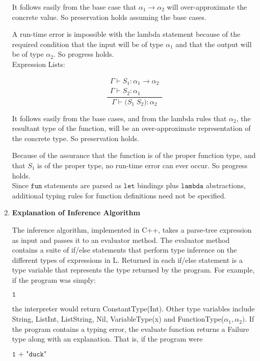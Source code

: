 \documentclass[10pt]{article} %
\begin{document}
\begin{enumerate}
It follows easily from the base case that $\alpha_1 \to \alpha_2$ will over-approximate the concrete value.  So preservation holds assuming the base cases.

A run-time error is impossible with the lambda statement because of the required condition that the input will be of type $\alpha_1$ and that the output will be of type $\alpha_2$.  So progress holds.\\

Expression Lists:

$$\frac{\begin{matrix}\Gamma \vdash S_1: \alpha_1 \to \alpha_2 \\ \Gamma \vdash S_2: \alpha_1\end{matrix}}{\Gamma \vdash \texttt{(}S_1\;S_2\texttt{)}: \alpha_2} $$

It follows easily from the base cases, and from the lambda rules that $\alpha_2$, the resultant type of the function, will be an over-approximate representation of the concrete type.  So preservation holds.

Because of the assurance that the function is of the proper function type, and that $S_1$ is of the proper type, no run-time error can ever occur.  So progress holds.\\

Since $\texttt{fun}$ statements are parsed as $\texttt{let}$ bindings plus $\texttt{lambda}$ abstractions, additional typing rules for function definitions need not be specified.
$$ $$

\item{\bf{Explanation of Inference Algorithm}}

The inference algorithm, implemented in C++, takes a parse-tree expression as input and passes it to an evaluator method.  The evaluator method contains a suite of if/else statements that perform type inference on the different types of expressions in L.  Returned in each if/else statement is a type variable that represents the type returned by the program.  For example, if the program was simply:

$\texttt{1}$

the interpreter would return ConstantType(Int).  Other type variables include String, ListInt, ListString, Nil, VariableType(x) and FunctionType($\alpha_1, \alpha_2)$.  If the program contains a typing error, the evaluate function returns a Failure type along with an explanation.  That is, if the program were

$\texttt{1 + "duck"}$


\end{enumerate}
\end{document}
